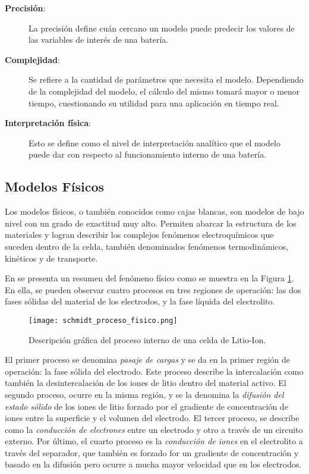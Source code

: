 \begin{description}
    \item [\textbf{Precisi\'on}:] La precisi\'on define cu\'an cercano un modelo
        puede predecir los valores de las variables de inter\'es de una
        bater\'ia.
    \item [\textbf{Complejidad}:] Se refiere a la cantidad de par\'ametros que
        necesita el modelo. Dependiendo de la complejidad del modelo, el 
        c\'alculo del mismo tomar\'a mayor o menor tiempo, cuestionando su 
        utilidad para una aplicaci\'on en tiempo real.
    \item [\textbf{Interpretaci\'on f\'isica}:] Esto se define como el nivel de
        interpretaci\'on anal\'itico que el modelo puede dar con respecto al
        funcionamiento interno de una bater\'ia.
\end{description}

\subsection{Modelos F\'isicos}\label{phyModel}

\noindent Los modelos f\'isicos, o tambi\'en conocidos como cajas blancas, son 
modelos de bajo nivel con un grado de exactitud muy alto. Permiten abarcar la 
estructura de los materiales y logran describir los complejos fen\'omenos 
electroqu\'imicos que suceden dentro de la celda, tambi\'en denominados 
fen\'omenos termodin\'amicos, kin\'eticos y de transporte.

\noindent En \cite{Schmidt2013} se presenta un resumen del fen\'omeno f\'isico 
como se muestra en la Figura \ref{schmidt_fen_fis}. En ella, se pueden observar 
cuatro procesos en tres regiones de operaci\'on: las dos fases s\'olidas del 
material de los electrodos, y la fase l\'iquida del electrolito.

\begin{figure}[h!]
    \begin{center}
        \texttt{[image: schmidt\_proceso\_fisico.png]}
        \caption{Descripci\'on gr\'afica del proceso interno de una celda de Litio-Ion.}
        \label{schmidt_fen_fis}
    \end{center}
\end{figure}

\noindent El primer proceso se denomina \emph{pasaje de cargas} y se da en 
la primer regi\'on de operaci\'on: la fase s\'olida del electrodo. 
Este proceso describe la intercalaci\'on como tambi\'en la desintercalaci\'on 
de los iones de litio dentro del material activo. El segundo proceso, ocurre 
en la misma regi\'on, y se la denomina la \emph{difusi\'on del estado s\'olido} 
de los iones de litio forzado por el gradiente de concentraci\'on de iones entre 
la superficie y el volumen del electrodo. El tercer proceso, se describe como 
la \emph{conducci\'on de electrones} entre un electrodo y otro a trav\'es de 
un circuito externo. Por \'ultimo, el cuarto proceso es la \emph{conducci\'on de 
iones} en el electrolito a trav\'es del separador, que tambi\'en es forzado for 
un gradiente de concentraci\'on y basado en la difusi\'on pero ocurre a mucha 
mayor velocidad que en los electrodos.

